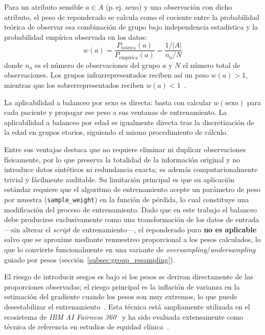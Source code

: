 Para un atributo sensible $a \in A$ (p.\,ej. sexo) y una observación con dicho atributo, el peso de reponderado se calcula como el cociente entre la probabilidad teórica de observar esa combinación de grupo bajo independencia estadística y la probabilidad empírica observada en los datos:
\begin{equation}
    w(a) = \frac{P_{\text{te\'orica}}(a)}{P_{\text{emp\'irica}}(a)} = \frac{1/|A|}{n_a / N}
\end{equation}
donde $n_a$ es el número de observaciones del grupo $a$ y $N$ el número total de observaciones. Los grupos infrarrepresentados reciben así un peso $w(a) > 1$, mientras que los sobrerrepresentados reciben $w(a) < 1$~\cite{zliobaite2017measuring,fairmodels2021}.

La aplicabilidad a balanceo por sexo es directa: basta con calcular $w(\text{sexo})$ para cada paciente y propagar ese peso a sus ventanas de entrenamiento. La aplicabilidad a balanceo por edad es igualmente directa tras la discretización de la edad en grupos etarios, siguiendo el mismo procedimiento de cálculo.

Entre sus ventajas destaca que no requiere eliminar ni duplicar observaciones físicamente, por lo que preserva la totalidad de la información original y no introduce datos sintéticos ni redundancia exacta; es además computacionalmente trivial y fácilmente auditable. Su limitación principal es que su aplicación estándar requiere que el algoritmo de entrenamiento acepte un parámetro de peso por muestra (\texttt{sample\_weight}) en la función de pérdida, lo cual constituye una modificación del proceso de entrenamiento. Dado que en este trabajo el balanceo debe producirse exclusivamente como una transformación de los datos de entrada —sin alterar el \emph{script} de entrenamiento—, el reponderado puro \textbf{no es aplicable} salvo que se aproxime mediante remuestreo proporcional a los pesos calculados, lo que lo convierte funcionalmente en una variante de \emph{oversampling}/\emph{undersampling} guiado por pesos (sección~\ref{subsec:group_resampling}).

El riesgo de introducir sesgos es bajo si los pesos se derivan directamente de las proporciones observadas; el riesgo principal es la inflación de varianza en la estimación del gradiente cuando los pesos son muy extremos, lo que puede desestabilizar el entrenamiento~\cite{krasanakis2018reweighting}. Esta técnica está ampliamente utilizada en el ecosistema de \emph{IBM AI Fairness 360}~\cite{bellamy2018ai360} y ha sido evaluada extensamente como técnica de referencia en estudios de equidad clínica~\cite{ricci2024sociodemographic}.

